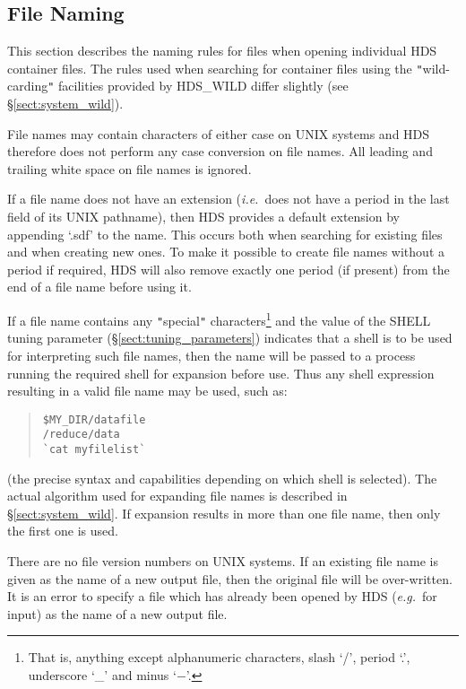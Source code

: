 \documentclass[11pt]{article}
\newcommand{\htmlref}[2]{#1}
\newcommand{\xlabel}[1]{}
\newcommand{\qt}[1]{``#1''}
\newcommand{\st}[1]{{\em{#1}}}
\renewcommand{\qt}[1]{{\tt{"}}#1{\tt{"}}}
\begin{document}
\subsection{\xlabel{file_naming}\label{sect:system_files}File Naming}

This section describes the naming rules for files when opening
individual HDS container files. The rules used when searching for
container files using the \qt{wild-carding} facilities provided by
\htmlref{HDS\_WILD}{HDS_WILD} differ slightly (see \S\ref{sect:system_wild}).

File names may contain characters of either case on UNIX systems and
HDS therefore does not perform any case conversion on file names. All
leading and trailing white space on file names is ignored.

If a file name does not have an extension (\st{i.e.}\ does not have a
period in the last field of its UNIX pathname), then HDS provides a
default extension by appending `.sdf' to the name. This occurs both
when searching for existing files and when creating new ones. To make
it possible to create file names without a period if required, HDS
will also remove exactly one period (if present) from the end of a
file name before using it.

If a file name contains any \qt{special} characters\footnote{That is,
anything except alphanumeric characters, slash `/', period `.',
underscore `\_' and minus `$-$'.} and the value of the SHELL tuning
parameter (\S\ref{sect:tuning_parameters}) indicates that a shell is
to be used for interpreting such file names, then the name will be
passed to a process running the required shell for expansion before
use. Thus any shell expression resulting in a valid file name may be
used, such as:

\small
\begin{quote}
\begin{verbatim}
$MY_DIR/datafile
/reduce/data
`cat myfilelist`
\end{verbatim}
\end{quote}
\normalsize

(the precise syntax and capabilities depending on which shell is
selected). The actual algorithm used for expanding file names is
described in \S\ref{sect:system_wild}. If expansion results in more
than one file name, then only the first one is used.

There are no file version numbers on UNIX systems. If an existing file
name is given as the name of a new output file, then the original file
will be over-written. It is an error to specify a file which has
already been opened by HDS (\st{e.g.}\ for input) as the name of a
new output file.
\end{document}
